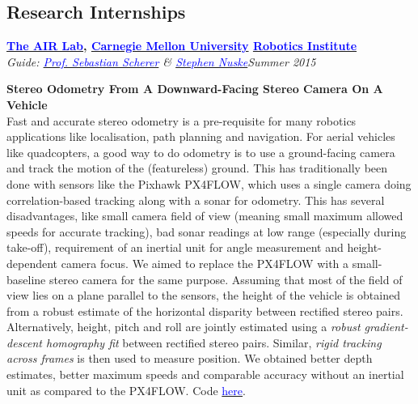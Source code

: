 \documentclass[margin,line]{res}
\newenvironment{list1}{
  \begin{list}{\ding{113}}{%
      \setlength{\itemsep}{0in}
      \setlength{\parsep}{0in} \setlength{\parskip}{0in}
      \setlength{\topsep}{0in} \setlength{\partopsep}{0in} 
      \setlength{\leftmargin}{0.17in}}}{\end{list}}
\begin{document}
\begin{resume}
\section{\sc Research Internships} 

{\bf  \href{http://theairlab.org/}{\textcolor{blue}{The AIR Lab}}, \href{http://www.cmu.edu/}{\textcolor{blue}{Carnegie Mellon University}} \href{http://ri.cmu.edu/}{\textcolor{blue}{Robotics Institute}}} \\
{\em Guide: \href{http://www.ri.cmu.edu/person.html?person_id=1397}{\textcolor{blue}{Prof. Sebastian Scherer}} \& \href{http://www.ri.cmu.edu/person.html?person_id=2128}{\textcolor{blue} {Stephen Nuske}}}\hfill\textit{Summer 2015} \\
\vspace*{-.13in}
\begin{list1}
\item[]\textbf{Stereo Odometry From A Downward-Facing Stereo Camera On A Vehicle} \\
Fast and accurate stereo odometry is a pre-requisite for many robotics applications like localisation, path planning and navigation. For aerial vehicles like quadcopters, a good way to do odometry is to use a ground-facing camera and track the motion of the (featureless) ground. This has traditionally been done with sensors like the Pixhawk PX4FLOW, which uses a single camera doing correlation-based tracking along with a sonar for odometry. This has several disadvantages, like small camera field of view (meaning small maximum allowed speeds for accurate tracking), bad sonar readings at low range (especially during take-off), requirement of an inertial unit for angle measurement and height-dependent camera focus. We aimed to replace the PX4FLOW with a small-baseline stereo camera for the same purpose. Assuming that most of the field of view lies on a plane parallel to the sensors, the height of the vehicle is obtained from a robust estimate of the horizontal disparity between rectified stereo pairs. Alternatively, height, pitch and roll are jointly estimated using a \textit{robust gradient-descent homography fit} between rectified stereo pairs. Similar, \textit{rigid tracking across frames} is then used to measure position. We obtained better depth estimates, better maximum speeds and comparable accuracy without an inertial unit as compared to the PX4FLOW. Code \href{https://github.com/alankarkotwal/ground_odom}{\textcolor{blue} {here}}.
\end{list1}


\end{resume}
\end{document}
